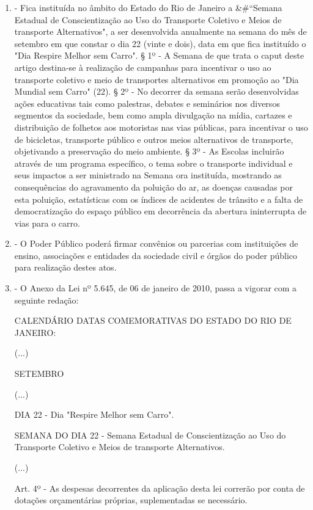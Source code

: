 \documentclass[10pt]{article}
\begin{document}
\begin{enumerate}[label=Art. \arabic*\textdegree]

\item - Fica instituída no âmbito do Estado do Rio de Janeiro a &#``Semana Estadual de Conscientização ao Uso do Transporte Coletivo e Meios de transporte Alternativos", a ser desenvolvida anualmente na semana do mês de setembro em que constar o dia 22 (vinte e dois), data em que fica instituído o "Dia Respire Melhor sem Carro".
 § 1º - A Semana de que trata o caput deste artigo destina-se à realização de campanhas para incentivar o uso ao transporte coletivo e meio de transportes alternativos em promoção ao "Dia Mundial sem Carro" (22). 
§ 2º - No decorrer da semana serão desenvolvidas ações educativas tais como palestras, debates e seminários nos diversos segmentos da sociedade, bem como ampla divulgação na mídia, cartazes e distribuição de folhetos aos motoristas nas vias públicas, para incentivar o uso de bicicletas, transporte público e outros meios alternativos de transporte, objetivando a preservação do meio ambiente.
§ 3º - As Escolas incluirão através de um programa específico, o tema sobre o transporte individual e seus impactos a ser ministrado na Semana ora instituída, mostrando as consequências do agravamento da poluição do ar, as doenças causadas por esta poluição, estatísticas com os índices de acidentes de trânsito e a falta de democratização do espaço público em decorrência da abertura ininterrupta de vias para o carro. 

\item - O Poder Público poderá firmar convênios ou parcerias com instituições de ensino, associações e entidades da sociedade civil e órgãos do poder público  para realização destes atos.

\item - O Anexo da Lei nº 5.645, de 06 de janeiro de 2010, passa a vigorar com a seguinte redação:

              CALENDÁRIO DATAS COMEMORATIVAS DO ESTADO DO RIO DE JANEIRO:

(...)

            SETEMBRO

             (...)

DIA 22 - Dia "Respire Melhor sem Carro".

         SEMANA DO DIA 22 - Semana Estadual de Conscientização ao Uso do Transporte Coletivo e Meios de transporte Alternativos.

(...)


               Art. 4º - As despesas decorrentes da aplicação desta lei correrão por conta de dotações orçamentárias próprias, suplementadas se necessário.


\end{enumerate}
\end{document}
